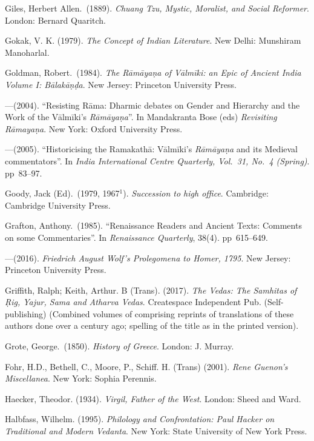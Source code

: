 \begin{thebibliography}{99}
Giles, Herbert Allen.\ (1889). {\sl Chuang Tzu, Mystic, Moralist, and Social Reformer}. London: Bernard Quaritch. 

Gokak, V. K.  (1979). {\sl The Concept of Indian Literature}. New Delhi: Munshiram Manoharlal. 

Goldman, Robert.\ (1984). {\sl The Rāmāyaṇa of Vālmīki: an Epic of Ancient India Volume I: Bālakāṇḍa}. New Jersey: Princeton University Press. 

---\kern3pt(2004). “Resisting Rāma: Dharmic debates on Gender and Hierarchy and the Work of the Vālmīki’s {\sl Rāmāyaṇa}”. In Mandakranta Bose (eds) {\sl Revisiting Rāmayaṇa}. New York: Oxford University Press. 

---\kern3pt(2005). “Historicising the Ramakathā: Vālmīki's {\sl Rāmāyaṇa} and its Medieval commentators”. In {\sl India International Centre Quarterly, Vol.~31, No.~4 (Spring)}. pp~83--97.

Goody, Jack (Ed).\ (1979, 1967$^{1}$). {\sl Succession to high office}. Cambridge: Cambridge University Press. 

Grafton, Anthony.\ (1985). “Renaissance Readers and Ancient Texts: Comments on some Commentaries”. In {\sl Renaissance Quarterly}, 38(4). pp~615--649.

---\kern3pt(2016). {\sl Friedrich August Wolf’s Prolegomena to Homer, 1795}.  New Jersey: Princeton University Press. 

Griffith, Ralph; Keith, Arthur. B (Trans). (2017). {\sl The Vedas: The Samhitas of Ṛig, Yajur, Sama and Atharva Vedas}. Createspace Independent Pub. (Self-publishing) (Combined volumes of comprising reprints of translations of these authors done over a century ago; spelling of the title as in the printed version).

Grote, George.\ (1850). {\sl History of Greece}.  London: J. Murray. 

Fohr, H.D., Bethell, C., Moore, P., Schiff. H. (Trans) (2001). {\sl Rene Guenon’s Miscellanea}. New York: Sophia Perennis. 

Haecker, Theodor. (1934). {\sl Virgil, Father of the West}. London: Sheed and Ward. 

Halbfass, Wilhelm. (1995). {\sl Philology and Confrontation: Paul Hacker on Traditional and Modern Vedanta}. New York: State University of New York Press. 


\end{thebibliography}

